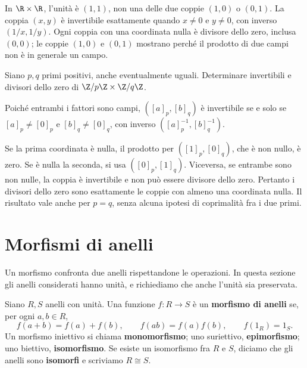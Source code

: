 \begin{esempio}
In $\R\times\R$, l'unità è $(1,1)$, non una delle due coppie $(1,0)$ o $(0,1)$. La coppia $(x,y)$ è invertibile esattamente quando $x\ne0$ e $y\ne0$, con inverso $(1/x,1/y)$. Ogni coppia con una coordinata nulla è divisore dello zero, inclusa $(0,0)$; le coppie $(1,0)$ e $(0,1)$ mostrano perché il prodotto di due campi non è in generale un campo.
\end{esempio}

\begin{esercizio}
Siano $p,q$ primi positivi, anche eventualmente uguali. Determinare invertibili e divisori dello zero di $\Z/p\Z\times\Z/q\Z$.
\end{esercizio}
\begin{svolgimento}
Poiché entrambi i fattori sono campi, $([a]_p,[b]_q)$ è invertibile se e solo se $[a]_p\ne[0]_p$ e $[b]_q\ne[0]_q$, con inverso $([a]_p^{-1},[b]_q^{-1})$.

Se la prima coordinata è nulla, il prodotto per $([1]_p,[0]_q)$, che è non nullo, è zero. Se è nulla la seconda, si usa $([0]_p,[1]_q)$. Viceversa, se entrambe sono non nulle, la coppia è invertibile e non può essere divisore dello zero. Pertanto i divisori dello zero sono esattamente le coppie con almeno una coordinata nulla. Il risultato vale anche per $p=q$, senza alcuna ipotesi di coprimalità fra i due primi.
\end{svolgimento}

\section{Morfismi di anelli}
Un morfismo confronta due anelli rispettandone le operazioni. In questa sezione gli anelli considerati hanno unità, e richiediamo che anche l'unità sia preservata.

\begin{definizione}
Siano $R,S$ anelli con unità. Una funzione $f:R\to S$ è un \textbf{morfismo di anelli} se, per ogni $a,b\in R$,
\[
f(a+b)=f(a)+f(b),\qquad f(ab)=f(a)f(b),\qquad f(1_R)=1_S.
\]
Un morfismo iniettivo si chiama \textbf{monomorfismo}; uno suriettivo, \textbf{epimorfismo}; uno biettivo, \textbf{isomorfismo}. Se esiste un isomorfismo fra $R$ e $S$, diciamo che gli anelli sono \textbf{isomorfi} e scriviamo $R\cong S$.
\end{definizione}

